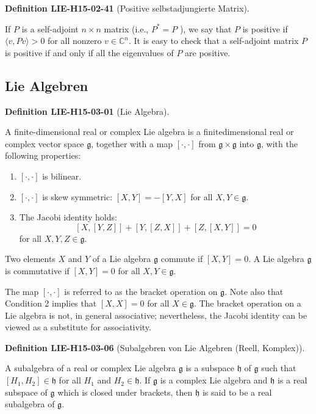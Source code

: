\documentclass[10pt, letterpaper]{article}
\newcommand{\CustomHeading}[3]{%
  \par\medskip\noindent%
  \textbf{#1 #2} \textnormal{(#3)}.\enskip%
}
\newenvironment{DEF}[2]{\CustomHeading{Definition}{#1}{#2}}{}
\begin{document}
\begin{DEF}{LIE-H15-02-41}{Positive selbstadjungierte Matrix}
If $P$ is a self-adjoint $n \times n$ matrix (i.e., $P^{*}=P$ ), we say that $P$ is positive if $\langle v, P v\rangle>0$ for all nonzero $v \in \mathbb{C}^{n}$. It is easy to check that a self-adjoint matrix $P$ is positive if and only if all the eigenvalues of $P$ are positive.
\end{DEF}

\subsection{Lie Algebren}

\begin{DEF}{LIE-H15-03-01}{Lie Algebra}
A finite-dimensional real or complex Lie algebra is a finitedimensional real or complex vector space $\mathfrak{g}$, together with a map $[\cdot, \cdot]$ from $\mathfrak{g} \times \mathfrak{g}$ into $\mathfrak{g}$, with the following properties:
\begin{enumerate}
  \item $[\cdot, \cdot]$ is bilinear.
  \item $[\cdot, \cdot]$ is skew symmetric: $[X, Y]=-[Y, X]$ for all $X, Y \in \mathfrak{g}$.
  \item The Jacobi identity holds:
  $$
  [X,[Y, Z]]+[Y,[Z, X]]+[Z,[X, Y]]=0
  $$
  for all $X, Y, Z \in \mathfrak{g}$.
\end{enumerate}
Two elements $X$ and $Y$ of a Lie algebra $\mathfrak{g}$ commute if $[X, Y]=0$. A Lie algebra $\mathfrak{g}$ is commutative if $[X, Y]=0$ for all $X, Y \in \mathfrak{g}$.

The map $[\cdot, \cdot]$ is referred to as the bracket operation on $\mathfrak{g}$. Note also that Condition 2 implies that $[X, X]=0$ for all $X \in \mathfrak{g}$. The bracket operation on a Lie algebra is not, in general associative; nevertheless, the Jacobi identity can be viewed as a substitute for associativity.
\end{DEF}

\begin{DEF}{LIE-H15-03-06}{Subalgebren von Lie Algebren (Reell, Komplex)}
A subalgebra of a real or complex Lie algebra $\mathfrak{g}$ is a subspace $\mathfrak{h}$ of $\mathfrak{g}$ such that $\left[H_{1}, H_{2}\right] \in \mathfrak{h}$ for all $H_{1}$ and $H_{2} \in \mathfrak{h}$. If $\mathfrak{g}$ is a complex Lie algebra and $\mathfrak{h}$ is a real subspace of $\mathfrak{g}$ which is closed under brackets, then $\mathfrak{h}$ is said to be a real subalgebra of $\mathfrak{g}$.
\end{DEF}
\end{document}

